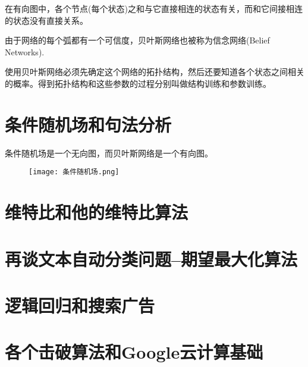 \documentclass[UTF8]{ctexart}
\begin{document}
	在有向图中，各个节点(每个状态)之和与它直接相连的状态有关，而和它间接相连的状态没有直接关系。

	由于网络的每个弧都有一个可信度，贝叶斯网络也被称为信念网络(Belief Networks).

	使用贝叶斯网络必须先确定这个网络的拓扑结构，然后还要知道各个状态之间相关的概率。得到拓扑结构和这些参数的过程分别叫做结构训练和参数训练。

	\section{条件随机场和句法分析}
	条件随机场是一个无向图，而贝叶斯网络是一个有向图。

	\begin{figure}[!htb]
	\centering
	\texttt{[image: 条件随机场.png]}
	\end{figure}
	\section{维特比和他的维特比算法}

	\section{再谈文本自动分类问题--期望最大化算法}

	\section{逻辑回归和搜索广告}

	\section{各个击破算法和Google云计算基础}
\end{document}
